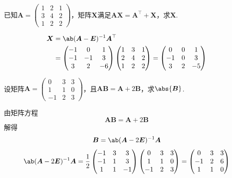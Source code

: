 \begin{exercise}
    已知$\boldsymbol{A}=
    \begin{pmatrix}
        1 & 2 & 1\\
        3 & 4 & 2\\
        1 & 2 & 2
    \end{pmatrix}
    $，矩阵$\boldsymbol{X}$满足$\boldsymbol{AX}=\boldsymbol{A}^{\top}+\boldsymbol{X}$，求$\boldsymbol{X}$.
\end{exercise}
\begin{solution}
    $$
    \begin{aligned}
    \boldsymbol{X}&=\ab(\boldsymbol{A}-\boldsymbol{E})^{-1}\boldsymbol{A}^{\top}\\
    &=\begin{pmatrix}
        -1 & 0 & 1\\
        -1 & -1 & 3\\
        3 & 2 & -6
    \end{pmatrix}
    \begin{pmatrix}
        1 & 3 & 1\\
        2 & 4 & 2\\
        1 & 2 & 2
    \end{pmatrix}=
    \begin{pmatrix}
        0 & 0 & 1\\
        -1 & 0 & 3\\
        3 & 2 & -5
    \end{pmatrix}
    \end{aligned}
    $$
\end{solution}

\begin{exercise}
    设矩阵$\boldsymbol{A}=
    \begin{pmatrix}
        0 & 3 & 3\\
        1 & 1 & 0\\
        -1 & 2 & 3
    \end{pmatrix}
    $，且$\boldsymbol{AB}=\boldsymbol{A}+2\boldsymbol{B}$，求$\abs{\boldsymbol{B}}$.
\end{exercise}
\begin{solution}
    由矩阵方程
    $$\boldsymbol{AB}=\boldsymbol{A}+2\boldsymbol{B}$$
    解得
    $$\boldsymbol{B}=\ab(\boldsymbol{A}-2\boldsymbol{E})^{-1}\boldsymbol{A}$$
    $$\ab(\boldsymbol{A}-2\boldsymbol{E})^{-1}\boldsymbol{A}=\frac{1}{2}
    \begin{pmatrix}
        -1 & 3 & 3\\
        -1 & 1 & 3\\
        1 & 1 & -1
    \end{pmatrix}
    \begin{pmatrix}
        0 & 3 & 3\\
        1 & 1 & 0\\
        -1 & 2 & 3
    \end{pmatrix}
    =
    \begin{pmatrix}
        0 & 3 & 3\\
        -1 & 2 & 6\\
        1 & 1 & 0
    \end{pmatrix}
    $$
\end{solution}

